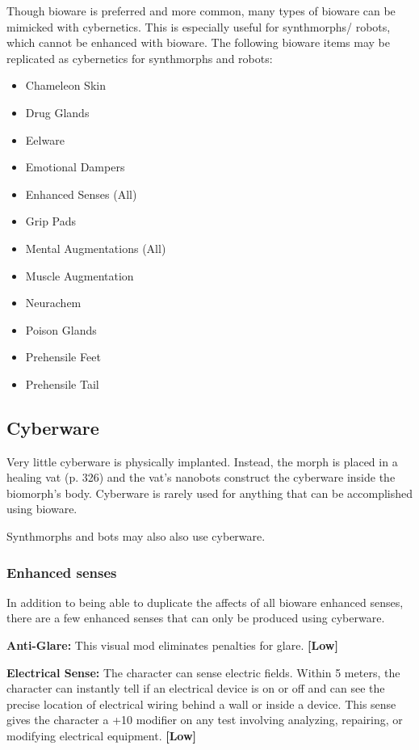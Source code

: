 Though bioware is preferred and more common, many types of bioware can be mimicked with cybernetics. This is especially useful for synthmorphs/ robots, which cannot be enhanced with bioware. The following bioware items may be replicated as cybernetics for synthmorphs and robots:

\begin{itemize}
	\item Chameleon Skin
	\item Drug Glands
	\item Eelware
	\item Emotional Dampers
	\item Enhanced Senses (All)
	\item Grip Pads
	\item Mental Augmentations (All)
	\item Muscle Augmentation
	\item Neurachem
	\item Poison Glands
	\item Prehensile Feet
	\item Prehensile Tail
\end{itemize}

\subsection{Cyberware}
\label{sec:cyberware}

Very little cyberware is physically implanted. Instead, the morph is placed in a healing vat (p. 326) and the vat’s nanobots construct the cyberware inside the biomorph’s body. Cyberware is rarely used for anything that can be accomplished using bioware.

Synthmorphs and bots may also also use cyberware.

\subsubsection{Enhanced senses}

In addition to being able to duplicate the affects of all bioware enhanced senses, there are a few enhanced senses that can only be produced using cyberware.

\textbf{Anti-Glare:} This visual mod eliminates penalties for glare. \textbf{[Low]}

\textbf{Electrical Sense:} The character can sense electric fields. Within 5 meters, the character can instantly tell if an electrical device is on or off and can see the precise location of electrical wiring behind a wall or inside a device. This sense gives the character a +10 modifier on any test involving analyzing, repairing, or modifying electrical equipment. \textbf{[Low]}

